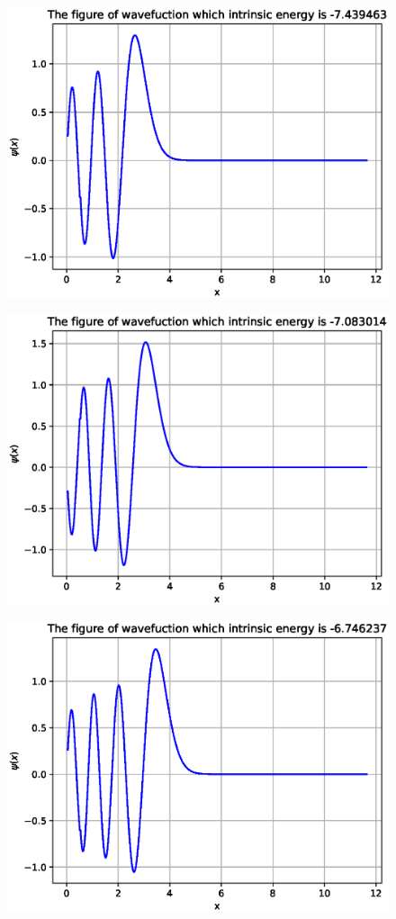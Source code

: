 \documentclass[twoside,twocolumn]{article}
\begin{document}
\begin{CJK*}{UTF8}{gkai}
\newpage
\begin{figure}
	\centering
	\includegraphics[width=0.9\linewidth]{figure/5}
	\label{fig:5}
\end{figure}
\begin{figure}
	\centering
	\includegraphics[width=0.9\linewidth]{figure/6}
	\label{fig:6}
\end{figure}
\begin{figure}
	\centering
	\includegraphics[width=0.9\linewidth]{figure/7}

\end{figure}
\end{CJK*}
\end{document}

